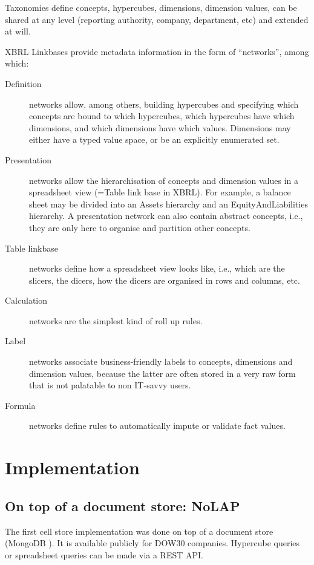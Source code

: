 \documentclass{vldb}
\begin{document}
Taxonomies define concepts, hypercubes, dimensions, dimension values, can be shared at any level (reporting authority, company, department, etc) and extended at will.

XBRL Linkbases provide metadata information in the form of ``networks'', among which:

\begin{description}
\item[Definition] networks allow, among others, building hypercubes and specifying which concepts are bound to which hypercubes, which hypercubes have which dimensions, and which dimensions have which values. Dimensions may either have a typed value space, or be an explicitly enumerated set. 
\item[Presentation] networks allow the hierarchisation of concepts and dimension values in a spreadsheet view (=Table link base in XBRL). For example, a balance sheet may be divided into an Assets hierarchy and an EquityAndLiabilities hierarchy. A presentation network can also contain abstract concepts, i.e., they are only here to organise and partition other concepts. 
\item[Table linkbase] networks define how a spreadsheet view looks like, i.e., which are the slicers, the dicers, how the dicers are organised in rows and columns, etc.
\item[Calculation] networks are the simplest kind of roll up rules.
\item[Label] networks associate business-friendly labels to concepts, dimensions and dimension values, because the latter are often stored in a very raw form that is not palatable to non IT-savvy users.
\item[Formula] networks define rules to automatically impute or validate fact values.
\end{description}

\section{Implementation}
\label{section-implementation}

\subsection{On top of a document store: NoLAP}

The first cell store implementation was done on top of a document store (MongoDB \cite{MongoDB}). It is available publicly \cite{SECXBRL.info} for DOW30 companies. Hypercube queries or spreadsheet queries can be made via a REST API.
\end{document}
